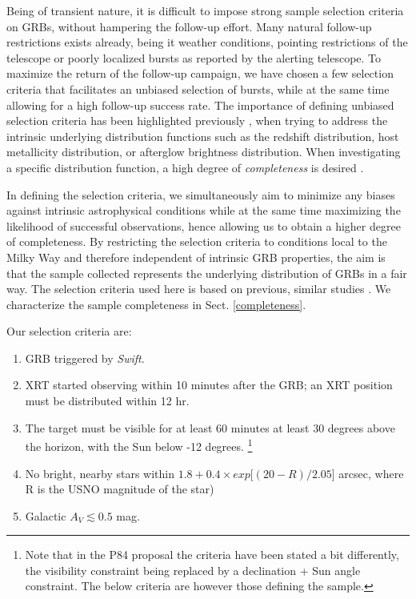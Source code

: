 \documentclass{aa}    %
\begin{document}
Being of transient nature, it is difficult to impose strong sample selection
criteria on GRBs, without hampering the follow-up effort. Many natural follow-up
restrictions exists already, being it weather conditions, pointing restrictions
of the telescope or poorly localized bursts as reported by the alerting
telescope. To maximize the return of the follow-up campaign, we have chosen a
few selection criteria that facilitates an unbiased selection of bursts, while
at the same time allowing for a high follow-up success rate. The importance of
defining unbiased selection criteria has been highlighted previously
\citep{Jakobsson2006b, Salvaterra2012, Hjorth2012, Vergani2015, Perley2016a},
when trying to address the intrinsic underlying distribution functions such as
the redshift distribution, host metallicity distribution, or afterglow
brightness distribution. When investigating a specific distribution function, a
high degree of \textit{completeness} is desired \citep[e.g.,][]{Perley2016b}.

In defining the selection criteria, we simultaneously aim to minimize any biases
against intrinsic astrophysical conditions while at the same time maximizing the
likelihood of successful observations, hence allowing us to obtain a higher
degree of completeness. By restricting the selection criteria to conditions
local to the Milky Way and therefore independent of intrinsic GRB properties,
the aim is that the sample collected represents the underlying distribution of
GRBs in a fair way. The selection criteria used here is based on previous,
similar studies \citep{Jakobsson2006b, Fynbo2009, Hjorth2012}. We characterize
the sample completeness in Sect. \ref{completeness}.

Our selection criteria are:

\begin{enumerate}
	\item GRB triggered by \textit{Swift}.
	\item XRT started observing within 10 minutes after the GRB; an XRT position must be distributed within 12 hr.
	\item The target must be visible for at least 60 minutes at least 30 degrees above the horizon, with the Sun below -12 degrees.
	\footnote{Note that in the P84 proposal the criteria have
	been stated a bit differently, the visibility constraint being replaced by a
	declination + Sun angle constraint. The below criteria are however those
	defining the sample.}
	\item No bright, nearby stars within $ 1.8 + 0.4 \times exp[(20 - R)/2.05$] arcsec, where R is the USNO magnitude of the star)
	\item Galactic $A_V \lesssim 0.5$ mag.
\end{enumerate}
\end{document}
